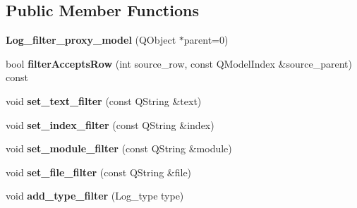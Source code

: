 \subsection*{Public Member Functions}
\begin{DoxyCompactItemize}
\item 
\hypertarget{class_log__viewer_1_1_log__filter__proxy__model_a8a0d26dd0fcfe6d44f7967cffd1f1a27}{{\bfseries Log\-\_\-filter\-\_\-proxy\-\_\-model} (Q\-Object $\ast$parent=0)}\label{class_log__viewer_1_1_log__filter__proxy__model_a8a0d26dd0fcfe6d44f7967cffd1f1a27}

\item 
\hypertarget{class_log__viewer_1_1_log__filter__proxy__model_ad6caf5597814e04894c1fe9f37c3c51f}{bool {\bfseries filter\-Accepts\-Row} (int source\-\_\-row, const Q\-Model\-Index \&source\-\_\-parent) const }\label{class_log__viewer_1_1_log__filter__proxy__model_ad6caf5597814e04894c1fe9f37c3c51f}

\item 
\hypertarget{class_log__viewer_1_1_log__filter__proxy__model_a82878c711e39666f7dbf359a471c5f73}{void {\bfseries set\-\_\-text\-\_\-filter} (const Q\-String \&text)}\label{class_log__viewer_1_1_log__filter__proxy__model_a82878c711e39666f7dbf359a471c5f73}

\item 
\hypertarget{class_log__viewer_1_1_log__filter__proxy__model_aa80925a3c0856ea81c1c6dc942c896c2}{void {\bfseries set\-\_\-index\-\_\-filter} (const Q\-String \&index)}\label{class_log__viewer_1_1_log__filter__proxy__model_aa80925a3c0856ea81c1c6dc942c896c2}

\item 
\hypertarget{class_log__viewer_1_1_log__filter__proxy__model_a5dd3f3cb9936f9b32bb2baeaf7e7b9c9}{void {\bfseries set\-\_\-module\-\_\-filter} (const Q\-String \&module)}\label{class_log__viewer_1_1_log__filter__proxy__model_a5dd3f3cb9936f9b32bb2baeaf7e7b9c9}

\item 
\hypertarget{class_log__viewer_1_1_log__filter__proxy__model_a9a11f16aa4f3f4b186a365e9fb1310dd}{void {\bfseries set\-\_\-file\-\_\-filter} (const Q\-String \&file)}\label{class_log__viewer_1_1_log__filter__proxy__model_a9a11f16aa4f3f4b186a365e9fb1310dd}

\item 
\hypertarget{class_log__viewer_1_1_log__filter__proxy__model_a490ed1c25beba6aebc0e300d9425e100}{void {\bfseries add\-\_\-type\-\_\-filter} (Log\-\_\-type type)}\label{class_log__viewer_1_1_log__filter__proxy__model_a490ed1c25beba6aebc0e300d9425e100}


\end{DoxyCompactItemize}
